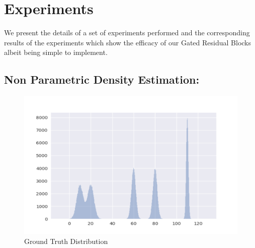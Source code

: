\documentclass[10pt,twocolumn,letterpaper]{article}
\begin{document}







\section{Experiments}
We present the details of a set of experiments performed and the corresponding results of the experiments which show the efficacy of our Gated Residual Blocks albeit being simple to implement.

\subsection{Non Parametric Density Estimation:}
\begin{figure}
    \centering
    \includegraphics[width=\linewidth]{Picture2}
    \caption{Ground Truth Distribution }\label{fig:1d_ground}
    \vspace{-4mm}
\end{figure}
\end{document}

